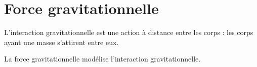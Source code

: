 
\section{Force gravitationnelle}
%

L'interaction gravitationnelle est une action à distance entre les corps : les corps ayant une masse s'attirent entre eux.


La force gravitationnelle modélise l'interaction gravitationnelle. 
